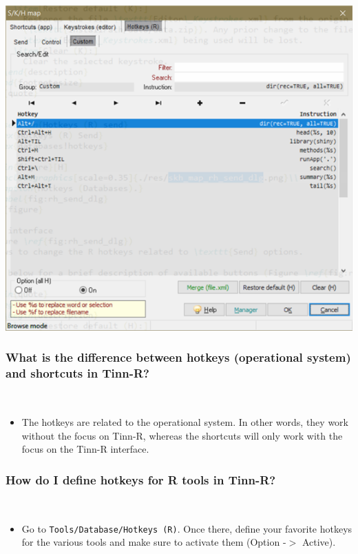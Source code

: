 \includegraphics[scale=.4]{./res/dlg_skh_map_rh_custom.png}

\subsubsection{What is the difference between hotkeys (operational system) and shortcuts in Tinn-R?}\\

\begin{itemize}
  \item The hotkeys are related to the operational system. In other
    words, they work without the focus on Tinn-R, whereas the
    shortcuts will only work with the focus on the Tinn-R interface.
\end{itemize}


\subsubsection{How do I define hotkeys for R tools in Tinn-R?}\\

\begin{itemize}
  \item Go to \texttt{Tools/Database/Hotkeys (R)}. Once there, define your favorite
    hotkeys for the various \RR{} tools and make sure to activate them
    (Option -$>$ Active).
\end{itemize}


